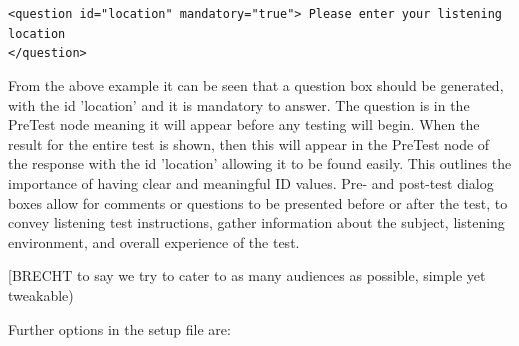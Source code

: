\documentclass{article}
\begin{document}
\texttt{<question id="location" mandatory="true"> Please enter your listening location \\ </question>}

From the above example it can be seen that a question box should be generated, with the id 'location' and it is mandatory to answer. The question is in the PreTest node meaning it will appear before any testing will begin. When the result for the  entire test is shown, then this will appear in the PreTest node of the response with the id 'location' allowing it to be found easily. This outlines the importance of having clear and meaningful ID values. Pre- and post-test dialog boxes allow for comments or questions to be presented before or after the test, to convey listening test instructions, gather information about the subject, listening environment, and overall experience of the test.
 
[BRECHT to say we try to cater to as many audiences as possible, simple yet tweakable)

Further options in the setup file are: 
\end{document}

